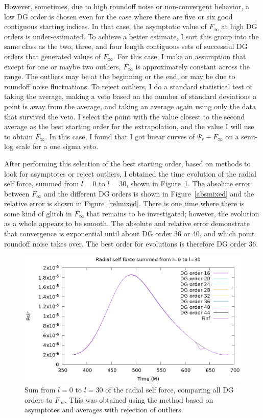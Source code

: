 However, sometimes, due to high roundoff noise or non-convergent behavior, a low DG order is chosen even for the case where there are five or six good contiguous starting indices. In that case, the asymptotic value of $F_\infty$ at high DG orders is under-estimated. To achieve a better estimate, I sort this group into the same class as the two, three, and four length contiguous sets of successful DG orders that generated values of $F_\infty$. For this case, I make an assumption that except for one or maybe two outliers, $F_\infty$ is approximately constant across the range. The outliers may be at the beginning or the end, or may be due to roundoff noise fluctuations. To reject outliers, I do a standard statistical test of taking the average, making a veto based on the number of standard deviations a point is away from the average, and taking an average again using only the data that survived the veto. I select the point with the value closest to the second average as the best starting order for the extrapolation, and the value I will use to obtain $F_\infty$. In this case, I found that I got linear curves of $\Psi_r-F_\infty$ on a semi-log scale for a one sigma veto.

After performing this selection of the best starting order, based on methods to look for asymptotes or reject outliers, I obtained the time evolution of the radial self force, summed from $l=0$ to $l=30$, shown in Figure~\ref{summixed}. The absolute error between $F_\infty$ and the different DG orders is shown in Figure~\ref{absmixed} and the relative error is shown in Figure~\ref{relmixed}. There is one time where there is some kind of glitch in $F_\infty$ that remains to be investigated; however, the evolution as a whole appears to be smooth. The absolute and relative error demonstrate that convergence is exponential until about DG order 36 or 40, and which point roundoff noise takes over. The best order for evolutions is therefore DG order 36. 

\begin{figure}
\includegraphics{psirvtwfinfdgorders}
\caption{Sum from $l=0$ to $l=30$ of the radial self force, comparing all DG orders to $F_\infty$. This was obtained using the method based on asymptotes and averages with rejection of outliers.}
\label{summixed}
\end{figure}

